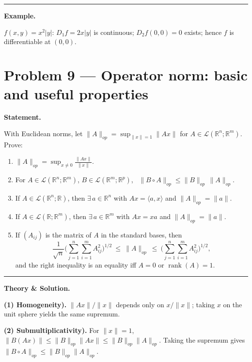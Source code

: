 \documentclass[12pt,a4paper]{article}
\theoremstyle{plain}
\theoremstyle{definition}
\theoremstyle{remark}
\theoremstyle{remark}
\newcommand{\gap}{\vspace{6pt}}
\begin{document}
\bigskip\hrule\bigskip

\textbf{Example.}\gap

$f(x,y)=x^2|y|$: $D_1 f=2x|y|$ is continuous; $D_2 f(0,0)=0$ exists; hence $f$ is differentiable at $(0,0)$.


\section*{Problem 9 — Operator norm: basic and useful properties}

\textbf{Statement.}\gap

With Euclidean norms, let $\|A\|_{op}=\sup_{\|x\|=1}\|Ax\|$ for $A\in\mathcal{L}(\mathbb{R}^n;\mathbb{R}^m)$.
Prove:
\begin{enumerate}\setlength{\itemsep}{6pt}
	\item $\displaystyle \|A\|_{op}=\sup_{x\neq 0}\frac{\|Ax\|}{\|x\|}$.
	\item For $A\in\mathcal{L}(\mathbb{R}^n;\mathbb{R}^m)$, $B\in\mathcal{L}(\mathbb{R}^m;\mathbb{R}^p)$,
	\ $\|B\circ A\|_{op}\le \|B\|_{op}\,\|A\|_{op}$.
	\item If $A\in\mathcal{L}(\mathbb{R}^n;\mathbb{R})$, then $\exists\,a\in\mathbb{R}^n$ with $Ax=\langle a,x\rangle$ and $\|A\|_{op}=\|a\|$.
	\item If $A\in\mathcal{L}(\mathbb{R};\mathbb{R}^m)$, then $\exists\,a\in\mathbb{R}^m$ with $Ax=xa$ and $\|A\|_{op}=\|a\|$.
	\item If $(A_{ij})$ is the matrix of $A$ in the standard bases, then
	\[
	\frac{1}{\sqrt{n}}\Big(\sum_{j=1}^n\sum_{i=1}^m A_{ij}^2\Big)^{1/2}
	\ \le\ \|A\|_{op}\ \le\
	\Big(\sum_{j=1}^n\sum_{i=1}^m A_{ij}^2\Big)^{1/2},
	\]
	and the right inequality is an equality iff $A=0$ or $\operatorname{rank}(A)=1$.
\end{enumerate}

\bigskip\hrule\bigskip

\textbf{Theory \& Solution.}\gap

\textbf{(1) Homogeneity).}\;
$\|Ax\|/\|x\|$ depends only on $x/\|x\|$; taking $x$ on the unit sphere yields the same supremum.

\medskip

\textbf{(2) Submultiplicativity).}\;
For $\|x\|=1$, $\|B(Ax)\|\le \|B\|_{op}\|Ax\|\le \|B\|_{op}\|A\|_{op}$.
Taking the supremum gives $\|B\circ A\|_{op}\le \|B\|_{op}\|A\|_{op}$.

\medskip
\end{document}
